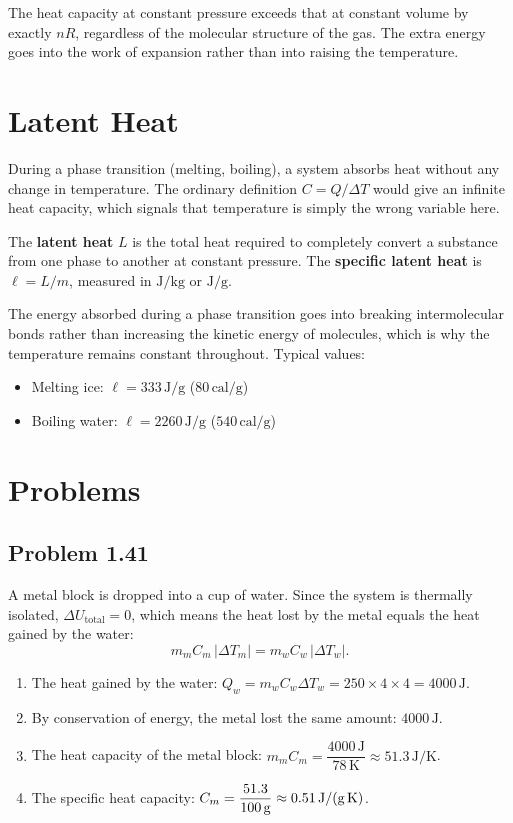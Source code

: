The heat capacity at constant pressure exceeds that at constant volume by exactly $nR$, regardless of the molecular structure of the gas. The extra energy goes into the work of expansion rather than into raising the temperature.

\section{Latent Heat}

During a phase transition (melting, boiling), a system absorbs heat without any change in temperature. The ordinary definition $C = Q/\Delta T$ would give an infinite heat capacity, which signals that temperature is simply the wrong variable here.

\begin{definition}
The \textbf{latent heat} $L$ is the total heat required to completely convert a substance from one phase to another at constant pressure. The \textbf{specific latent heat} is $\ell = L/m$, measured in $\text{J/kg}$ or $\text{J/g}$.
\end{definition}

The energy absorbed during a phase transition goes into breaking intermolecular bonds rather than increasing the kinetic energy of molecules, which is why the temperature remains constant throughout. Typical values:
\begin{itemize}
    \item Melting ice: $\ell = 333\,\text{J/g}$ ($80\,\text{cal/g}$)
    \item Boiling water: $\ell = 2260\,\text{J/g}$ ($540\,\text{cal/g}$)
\end{itemize}

\section*{Problems}

\subsection*{Problem 1.41}

A metal block is dropped into a cup of water. Since the system is thermally isolated, $\Delta U_\text{total} = 0$, which means the heat lost by the metal equals the heat gained by the water:
\[
    m_m C_m \,|\Delta T_m| = m_w C_w \,|\Delta T_w|.
\]

\begin{enumerate}[label=\alph*)]
    \item The heat gained by the water: $Q_w = m_w C_w \Delta T_w = 250 \times 4 \times 4 = 4000\,\text{J}$.
    \item By conservation of energy, the metal lost the same amount: $4000\,\text{J}$.
    \item The heat capacity of the metal block: $m_m C_m = \dfrac{4000\,\text{J}}{78\,\text{K}} \approx 51.3\,\text{J/K}$.
    \item The specific heat capacity: $C_m = \dfrac{51.3}{100\,\text{g}} \approx 0.51\,\text{J/(g\,K)}$.
\end{enumerate}

